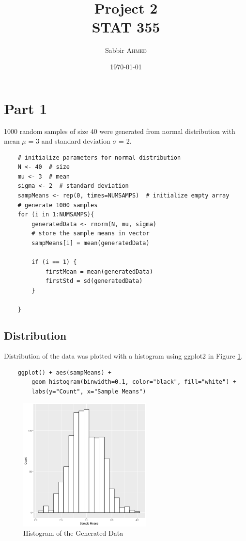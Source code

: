 \documentclass{article}
\title{Project 2 \\ STAT 355}  %
\author{Sabbir \textsc{Ahmed}}  %
\date{\today}  %
\begin{document}
    \maketitle %

    \section{Part 1}
        1000 random samples of size 40 were generated from normal distribution with mean $\mu$ = 3 and standard deviation $\sigma$ = 2.

\begin{lstlisting}
    # initialize parameters for normal distribution
    N <- 40  # size
    mu <- 3  # mean
    sigma <- 2  # standard deviation
    sampMeans <- rep(0, times=NUMSAMPS)  # initialize empty array
    # generate 1000 samples
    for (i in 1:NUMSAMPS){
        generatedData <- rnorm(N, mu, sigma)
        # store the sample means in vector
        sampMeans[i] = mean(generatedData)

        if (i == 1) {
            firstMean = mean(generatedData)
            firstStd = sd(generatedData)
        }

    }
\end{lstlisting}

        

        \subsection{Distribution}
            Distribution of the data was plotted with a histogram using ggplot2 in Figure \ref{fig:hist1}.
\begin{lstlisting}
    ggplot() + aes(sampMeans) + 
        geom_histogram(binwidth=0.1, color="black", fill="white") +
        labs(y="Count", x="Sample Means")
\end{lstlisting}

            \begin{figure}[h]
                \begin{center}
                    \includegraphics[width=0.6\textwidth]{figures/hist1.png}
                    \caption{Histogram of the Generated Data} \label{fig:hist1}
                \end{center}
            \end{figure}
\end{document}
